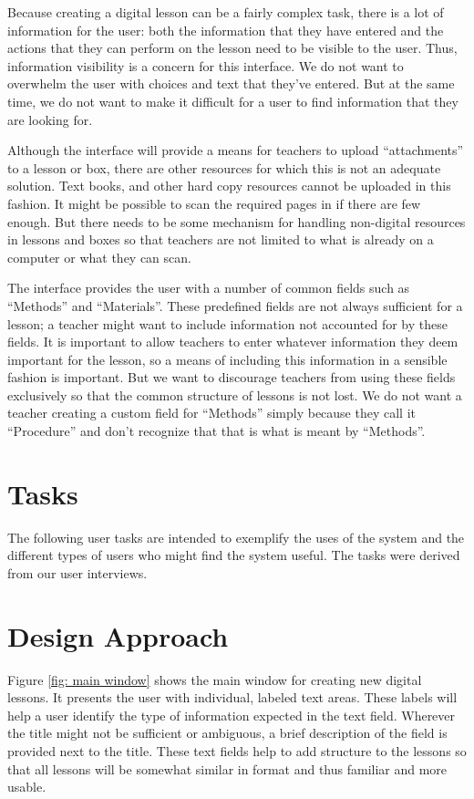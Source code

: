 \documentclass[10pt,letter]{article}
\begin{document}
Because creating a digital lesson can be a fairly complex task, there is a lot
of information for the user: both the information that they have entered and the
actions that they can perform on the lesson need to be visible to the user.
Thus, information visibility is a concern for this interface. We do not want to
overwhelm the user with choices and text that they've entered. But at the same
time, we do not want to make it difficult for a user to find information that
they are looking for.

Although the interface will provide a means for teachers to upload
``attachments'' to a lesson or box, there are other resources for which this is
not an adequate solution. Text books, and other hard copy resources cannot be
uploaded in this fashion. It might be possible to scan the required pages in if
there are few enough. But there needs to be some mechanism for handling
non-digital resources in lessons and boxes so that teachers are not limited to
what is already on a computer or what they can scan.

The interface provides the user with a number of common fields such as
``Methods'' and ``Materials''. These predefined fields are not always sufficient
for a lesson; a teacher might want to include information not accounted for by
these fields. It is important to allow teachers to enter whatever information
they deem important for the lesson, so a means of including this information in
a sensible fashion is important.  But we want to discourage teachers from using
these fields exclusively so that the common structure of lessons is not lost. We
do not want a teacher creating a custom field for ``Methods'' simply because
they call it ``Procedure'' and don't recognize that that is what is meant by
``Methods''.

\section{Tasks}
The following user tasks are intended to exemplify the uses of the system and
the different types of users who might find the system useful. The tasks were
derived from our user interviews.



\section{Design Approach}
Figure \ref{fig: main window} shows the main window for creating new digital
lessons. It presents the user with individual, labeled text areas. These labels
will help a user identify the type of information expected in the text field.
Wherever the title might not be sufficient or ambiguous, a brief description of
the field is provided next to the title. These text fields help to add
structure to the lessons so that all lessons will be somewhat similar in format
and thus familiar and more usable.
\end{document}
